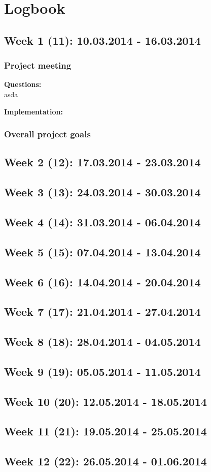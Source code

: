 \section{Logbook}
\subsection*{Week 1 (11): 10.03.2014 - 16.03.2014}
\subsubsection*{Project meeting}
\textbf{Questions:}\\
asda

\textbf{Implementation:}

\subsubsection*{Overall project goals}

\subsection*{Week 2 (12): 17.03.2014 - 23.03.2014}
\subsection*{Week 3 (13): 24.03.2014 - 30.03.2014}
\subsection*{Week 4 (14): 31.03.2014 - 06.04.2014}
\subsection*{Week 5 (15): 07.04.2014 - 13.04.2014}
\subsection*{Week 6 (16): 14.04.2014 - 20.04.2014}
\subsection*{Week 7 (17): 21.04.2014 - 27.04.2014}
\subsection*{Week 8 (18): 28.04.2014 - 04.05.2014}
\subsection*{Week 9 (19): 05.05.2014 - 11.05.2014}
\subsection*{Week 10 (20): 12.05.2014 - 18.05.2014}
\subsection*{Week 11 (21): 19.05.2014 - 25.05.2014}
\subsection*{Week 12 (22): 26.05.2014 - 01.06.2014}



